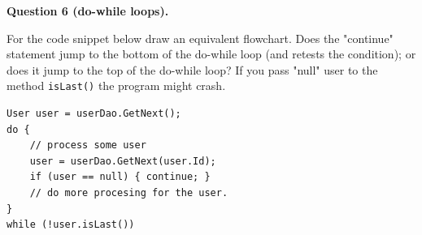 \documentclass[11pt]{article}
\begin{document}
{\bf Question 6 (do-while loops).}

For the code snippet below draw an equivalent flowchart. 
Does the "continue" statement jump to the bottom 
of the do-while loop (and retests the condition); 
or does it jump to the top of the do-while loop?
If you pass "null" user to the method {\tt isLast()} 
the program might crash.

\begin{Verbatim}[frame=single]
User user = userDao.GetNext();
do {
    // process some user
    user = userDao.GetNext(user.Id);
    if (user == null) { continue; }
    // do more procesing for the user. 
}
while (!user.isLast())
\end{Verbatim}
\end{document}
